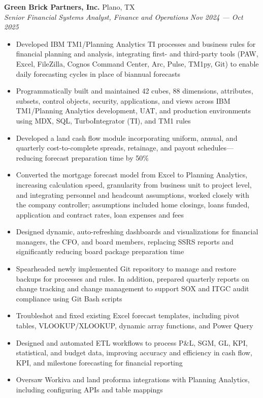 \documentclass[a4paper,12pt]{article}
\begin{document}
\textbf{Green Brick Partners, Inc.} \hfill Plano, TX \\
\textit{Senior Financial Systems Analyst, Finance and Operations} \hfill \textit{Nov 2024 --- Oct 2025}
\begin{itemize}
    \item Developed IBM TM1/Planning Analytics TI processes and business rules for financial planning and analysis, integrating first- and third-party tools (PAW, Excel, FileZilla, Cognos Command Center, Arc, Pulse, TM1py, Git) to enable daily forecasting cycles in place of biannual forecasts  
    \item Programmatically built and maintained 42 cubes, 88 dimensions, attributes, subsets, control objects, security, applications, and views across IBM TM1/Planning Analytics development, UAT, and production environments using MDX, SQL, TurboIntegrator (TI), and TM1 rules  
    \item Developed a land cash flow module incorporating uniform, annual, and quarterly cost-to-complete spreads, retainage, and payout schedules—reducing forecast preparation time by 50\%
    \item Converted the mortgage forecast model from Excel to Planning Analytics, increasing calculation speed, granularity from business unit to project level, and integrating personnel and headcount assumptions, worked closely with the company controller; assumptions included home closings, loans funded, application and contract rates, loan expenses and fees
    \item Designed dynamic, auto-refreshing dashboards and visualizations for financial managers, the CFO, and board members, replacing SSRS reports and significantly reducing board package preparation time
    \item Spearheaded newly implemented Git repository to manage and restore backups for processes and rules. In addition, prepared quarterly reports on change tracking and change management to support SOX and ITGC audit compliance using Git Bash scripts
    \item Troubleshot and fixed existing Excel forecast templates, including pivot tables, VLOOKUP/XLOOKUP, dynamic array functions, and Power Query
    \item Designed and automated ETL workflows to process P\&L, SGM, GL, KPI, statistical, and budget data, improving accuracy and efficiency in cash flow, KPI, and milestone forecasting for financial reporting  
    \item Oversaw Workiva and land proforma integrations with Planning Analytics, including configuring APIs and table mappings
\end{itemize}
\end{document}

